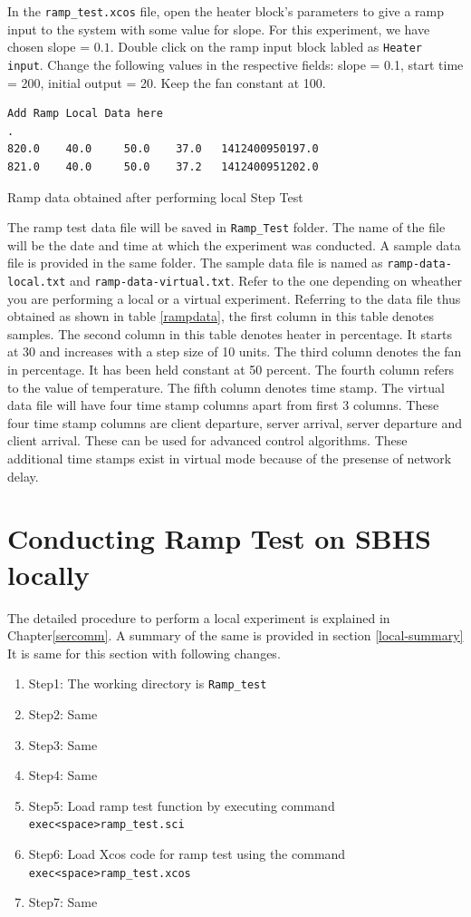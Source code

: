  In the {\tt ramp\_test.xcos} file, open the heater block's parameters to give a ramp input to the system with some value for slope. For this experiment, we have chosen slope = $0.1$. Double click on the ramp input block labled as {\tt Heater input}. Change the following values in the respective fields: slope = 0.1, start time = 200, initial output = 20. Keep the fan constant at 100.


\begin{table}
\begin{verbatim}
Add Ramp Local Data here
.
820.0    40.0     50.0    37.0   1412400950197.0
821.0    40.0     50.0    37.2   1412400951202.0
\end{verbatim}
\caption{Ramp data obtained after performing local Step Test}
\label{rampdata}
\end{table}

The ramp test data file will be saved in {\tt Ramp\_Test} folder. The name of the file will be the date and time at which the experiment was conducted. A sample data file is provided in the same folder. The sample data file is named as {\tt ramp-data-local.txt} and {\tt ramp-data-virtual.txt}. Refer to the one depending on wheather you are performing a local or a virtual experiment. Referring to the data file thus obtained as shown in table \ref{rampdata}, the first column in this table denotes samples. The second column in this table denotes heater in percentage. It starts at 30 and increases with a step size of 10 units. The third column denotes the fan in percentage. It has been held constant at 50 percent. The fourth column refers to the value of temperature. The fifth column denotes time stamp. The virtual data file will have four time stamp columns apart from first 3 columns. These four time stamp columns are client departure, server arrival, server departure and client arrival. These can be used for advanced control algorithms. These additional time stamps exist in virtual mode because of the presense of network delay.

\section{Conducting Ramp Test on SBHS locally}
The detailed procedure to perform a local experiment is explained in Chapter\ref{sercomm}. A summary of the same is provided in section \ref{local-summary} It is same for this section with following changes.

\begin{enumerate}
\item Step1: The working directory is {\tt  Ramp\_test}
\item Step2: Same
\item Step3: Same
\item Step4: Same
\item Step5: Load ramp test function by executing command\\ {\tt exec<space>ramp\_test.sci}
\item Step6: Load Xcos code for ramp test using the command\\ {\tt exec<space>ramp\_test.xcos}
\item Step7: Same
\end{enumerate}
